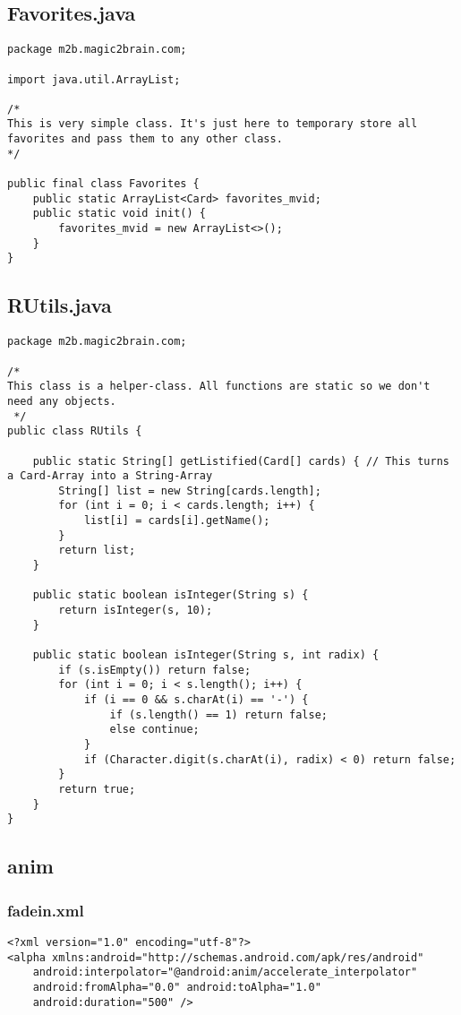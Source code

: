 \subsection{Favorites.java}
\begin{lstlisting}
package m2b.magic2brain.com;

import java.util.ArrayList;

/*
This is very simple class. It's just here to temporary store all favorites and pass them to any other class.
*/

public final class Favorites {
    public static ArrayList<Card> favorites_mvid;
    public static void init() {
        favorites_mvid = new ArrayList<>();
    }
}
\end{lstlisting}
\newpage
\subsection{RUtils.java}
\begin{lstlisting}
package m2b.magic2brain.com;

/*
This class is a helper-class. All functions are static so we don't need any objects.
 */
public class RUtils {

    public static String[] getListified(Card[] cards) { // This turns a Card-Array into a String-Array
        String[] list = new String[cards.length];
        for (int i = 0; i < cards.length; i++) {
            list[i] = cards[i].getName();
        }
        return list;
    }

    public static boolean isInteger(String s) {
        return isInteger(s, 10);
    }

    public static boolean isInteger(String s, int radix) {
        if (s.isEmpty()) return false;
        for (int i = 0; i < s.length(); i++) {
            if (i == 0 && s.charAt(i) == '-') {
                if (s.length() == 1) return false;
                else continue;
            }
            if (Character.digit(s.charAt(i), radix) < 0) return false;
        }
        return true;
    }
}
\end{lstlisting}
\newpage

\subsection{anim}
\subsubsection{fadein.xml}
\begin{lstlisting}
<?xml version="1.0" encoding="utf-8"?>
<alpha xmlns:android="http://schemas.android.com/apk/res/android"
    android:interpolator="@android:anim/accelerate_interpolator"
    android:fromAlpha="0.0" android:toAlpha="1.0"
    android:duration="500" />
\end{lstlisting}

